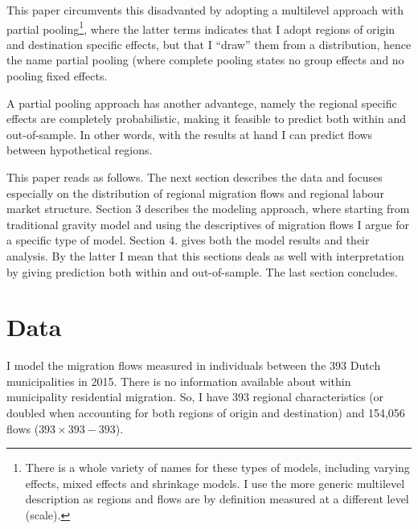 \documentclass[fleqn,10pt]{SelfArx} %
\begin{document}
        This paper circumvents this disadvanted by adopting a
        multilevel approach with partial pooling\footnote{There is a
          whole variety of names for these types of models, including
          varying effects, mixed effects and shrinkage models. I use
          the more generic multilevel description as regions and flows
          are by definition measured at a different level (scale).},
        where the latter terms indicates that I adopt regions of
        origin and destination specific effects, but that I ``draw''
        them from a distribution, hence the name partial pooling
        (where complete pooling states no group effects and no pooling
        fixed effects.

        A partial pooling approach has another advantege, namely the
        regional specific effects are completely probabilistic, making
        it feasible to predict both within and out-of-sample. In other
        words, with the results at hand I can predict flows between
        hypothetical regions.

        This paper reads as follows. The next section describes the
        data and focuses especially on the distribution of regional
        migration flows and regional labour market structure. Section
        3 describes the modeling approach, where starting from
        traditional gravity model and using the descriptives of
        migration flows I argue for a specific type of model. Section
        4. gives both the model results and their analysis. By the
        latter I mean that this sections deals as well with
        interpretation by giving prediction both within and
        out-of-sample. The last section concludes.

        \section{Data}

        I model the migration flows measured in individuals between
        the 393 Dutch municipalities in 2015. There is no information
        available about within municipality residential migration. So,
        I have 393 regional characteristics (or doubled when
        accounting for both regions of origin and destination) and
        154,056 flows ($393 \times 393 - 393$). 
\end{document}
